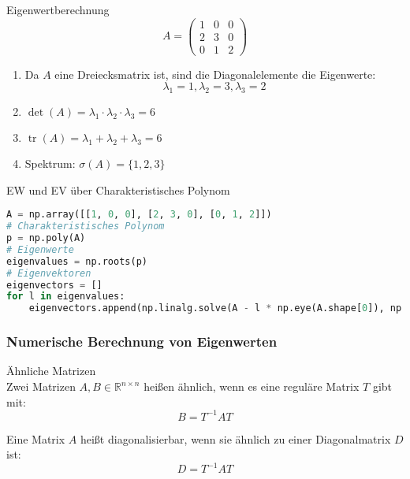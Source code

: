 \begin{example2}{Eigenwertberechnung}
$$A = \begin{pmatrix} 1 & 0 & 0\\ 2 & 3 & 0\\ 0 & 1 & 2\end{pmatrix}$$
\begin{enumerate}
    \item Da $A$ eine Dreiecksmatrix ist, sind die Diagonalelemente die Eigenwerte:
    $$\lambda_1 = 1, \lambda_2 = 3, \lambda_3 = 2$$
    \item $\det(A) = \lambda_1\cdot\lambda_2\cdot\lambda_3 = 6$
    \item $\operatorname{tr}(A) = \lambda_1 + \lambda_2 + \lambda_3 = 6$
    \item Spektrum: $\sigma(A) = \{1,2,3\}$
\end{enumerate}
\end{example2}

\begin{examplecode}{EW und EV über Charakteristisches Polynom}
\begin{lstlisting}[language=Python, style=basesmol]
A = np.array([[1, 0, 0], [2, 3, 0], [0, 1, 2]])
# Charakteristisches Polynom
p = np.poly(A)
# Eigenwerte
eigenvalues = np.roots(p)
# Eigenvektoren
eigenvectors = []
for l in eigenvalues:
    eigenvectors.append(np.linalg.solve(A - l * np.eye(A.shape[0]), np.zeros(A.shape[0])))
\end{lstlisting}
\end{examplecode}

\subsubsection{Numerische Berechnung von Eigenwerten}

\begin{concept}{Ähnliche Matrizen}\\
Zwei Matrizen $A,B \in \mathbb{R}^{n\times n}$ heißen ähnlich, wenn es eine reguläre Matrix $T$ gibt mit:
$$B = T^{-1}AT$$

Eine Matrix $A$ heißt diagonalisierbar, wenn sie ähnlich zu einer Diagonalmatrix $D$ ist:
$$D = T^{-1}AT$$
\end{concept}


